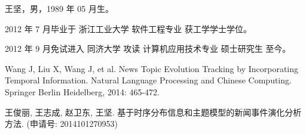\begin{resume}

  王坚，男，1989 年 05 月生。
  
  2012 年 7 月毕业于 浙江工业大学 软件工程专业 获工学学士学位。
  
  2012 年 9 月免试进入 同济大学 攻读 计算机应用技术专业 硕士研究生 至今。

  \begin{enumerate}[{[}1{]}]
    \setlength{\itemindent}{-10pt}%
    \item Wang J, Liu X, Wang J, et al. News Topic Evolution Tracking
    by Incorporating Temporal Information. Natural Language Processing
    and Chinese Computing. Springer Berlin Heidelberg, 2014: 465-472.
  \end{enumerate}

  \begin{enumerate}[{[}1{]}]
    \setlength{\itemindent}{-10pt}%
    \item 王俊丽, 王志成, 赵卫东, 王坚. 基于时序分布信息和主题模型的新闻事件演化分析
    方法. (申请号: 2014101270953)
  \end{enumerate}

\end{resume}
